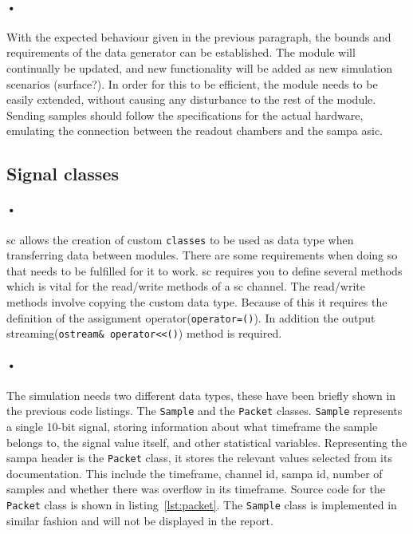 \documentclass[a4paper, 12pt]{report}
\newcommand{\codeword}[1]{\texttt{#1}}
\begin{document}
\paragraph{•}
With the expected behaviour given in the previous paragraph, the bounds and requirements of the data generator can be established.
The module will continually be updated, and new functionality will be added as new simulation scenarios (surface?). 
In order for this to be efficient, the module needs to be easily extended, without causing any disturbance to the rest of the module.
Sending samples should follow the specifications for the actual hardware, emulating the connection between the readout chambers and the \gls{sampa} asic.


\subsection{Signal classes}
\paragraph{•}
\gls{sc} allows the creation of custom \codeword{classes} to be used as data type when transferring data between modules.
There are some requirements when doing so that needs to be fulfilled for it to work.
\gls{sc} requires you to define several methods which is vital for the read/write methods of a \gls{sc} channel.
The read/write methods involve copying the custom data type.
Because of this it requires the definition of the assignment operator(\codeword{operator=()}).
In addition the output streaming(\codeword{ostream\& operator<<()}) method is required. 

\paragraph{•}
The simulation needs two different data types, these have been briefly shown in the previous code listings.
The \codeword{Sample} and the \codeword{Packet} classes.
\codeword{Sample} represents a single 10-bit signal, storing information about what timeframe the sample belongs to, the signal value itself, and other statistical variables.
Representing the \gls{sampa} header is the \codeword{Packet} class, it stores the relevant values selected from its documentation.
This include the timeframe, channel id, sampa id, number of samples and whether there was overflow in its timeframe.
Source code for the \codeword{Packet} class is shown in listing~\ref{lst:packet}.
The \codeword{Sample} class is implemented in similar fashion and will not be displayed in the report. 
\end{document}
